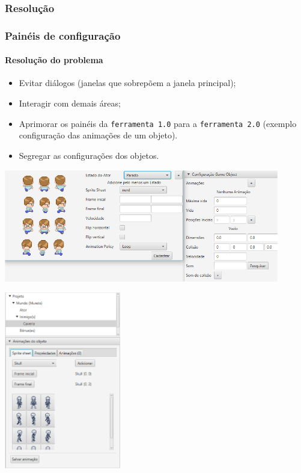 \documentclass{beamer}
\begin{document}
   \subsubsection{Resolução}
   \begin{frame}
      \frametitle{Painéis de configuração}
      \framesubtitle{Resolução do problema}

      \begin{itemize}
         \item Evitar diálogos (janelas que sobrepõem a janela principal);
         \item Interagir com demais áreas;
         \item Aprimorar os painéis da \texttt{ferramenta 1.0} para a \texttt{ferramenta 2.0} (exemplo configuração das animações de um objeto).
         \item Segregar as configurações dos objetos.
      \end{itemize}
   \end{frame}

   \begin{frame}
      \begin{center}
         \includegraphics[width=0.9\textwidth]{images/add_animacao_1.png}
      \end{center}
   \end{frame}

   \begin{frame}
      \begin{center}
         \includegraphics[width=0.38\textwidth]{images/add_animacao_2.png}
      \end{center}
   \end{frame}
\end{document}
